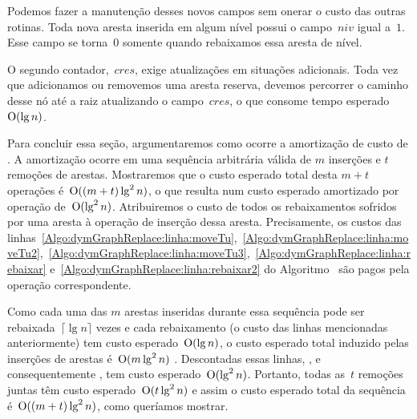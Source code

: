 Podemos fazer a manutenção desses novos campos sem onerar o custo das outras rotinas.
Toda nova aresta inserida em algum nível possui o campo~$niv$ igual a~$1$.
Esse campo se torna~$0$ somente quando rebaixamos essa aresta de nível.

O segundo contador,~$cres$, exige atualizações em situações adicionais.
Toda vez que adicionamos ou removemos uma aresta reserva, devemos percorrer o caminho desse nó até a raiz atualizando o campo~$cres$, o que consome tempo esperado~$\mathrm{O}(\lg n)$.

Para concluir essa seção, argumentaremos como ocorre a amortização de custo de \dymGraphDelEdge{}. 
A amortização ocorre em uma sequência arbitrária válida de $m$ inserções e $t$ remoções de arestas.
Mostraremos que o custo esperado total desta $m+t$ operações é~$\mathrm{O}((m+t)\lg^2 n)$,
o que resulta num custo esperado amortizado por operação de~$\mathrm{O}(\lg^2 n)$.
Atribuiremos o custo de todos os rebaixamentos sofridos por uma aresta à operação de inserção dessa aresta.
Precisamente, os custos das linhas~\ref{Algo:dymGraphReplace:linha:moveTu},~\ref{Algo:dymGraphReplace:linha:moveTu2},~\ref{Algo:dymGraphReplace:linha:moveTu3},~\ref{Algo:dymGraphReplace:linha:rebaixar} e~\ref{Algo:dymGraphReplace:linha:rebaixar2} do Algoritmo~\dymGraphReplace{} são pagos pela operação \dymGraphAddEdge{} correspondente.

Como cada uma das $m$ arestas inseridas durante essa sequência pode ser rebaixada~$\lceil \lg n \rceil$ vezes e cada rebaixamento (o custo das linhas mencionadas anteriormente) tem custo esperado~$\mathrm{O}(\lg n)$, o custo esperado total induzido pelas inserções de arestas é~$\mathrm{O}(m\lg^2 n)$ .
Descontadas essas linhas, \dymGraphReplace{}, e consequentemente \dymGraphDelEdge{}, tem custo esperado~$\mathrm{O}(\lg^2 n)$.
Portanto, todas as~$t$ remoções juntas têm custo esperado~$\mathrm{O}(t\lg^2 n)$ e assim o custo esperado total da sequência é~$\mathrm{O}((m+t)\lg^2 n)$, como queríamos mostrar.


